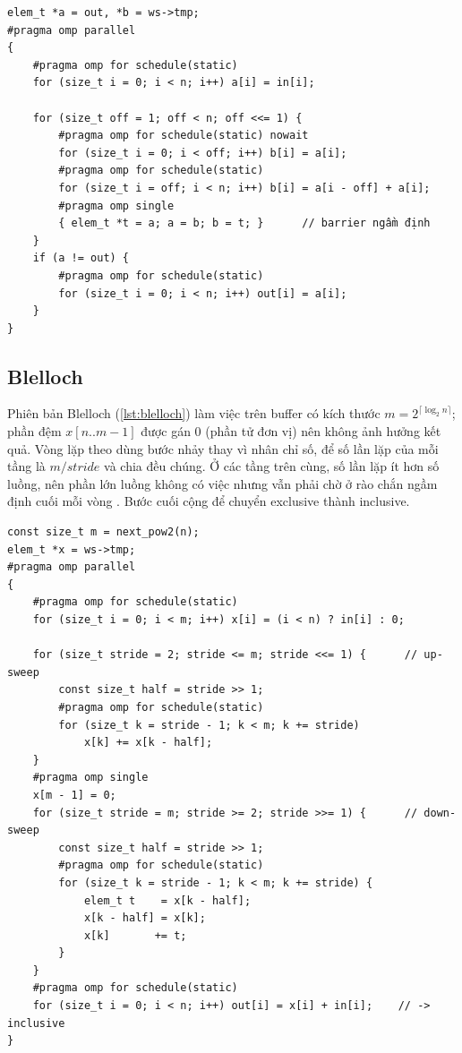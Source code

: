 \begin{lstlisting}[caption={Hillis--Steele với bộ đệm kép.},label={lst:hs}]
elem_t *a = out, *b = ws->tmp;
#pragma omp parallel
{
    #pragma omp for schedule(static)
    for (size_t i = 0; i < n; i++) a[i] = in[i];

    for (size_t off = 1; off < n; off <<= 1) {
        #pragma omp for schedule(static) nowait
        for (size_t i = 0; i < off; i++) b[i] = a[i];
        #pragma omp for schedule(static)
        for (size_t i = off; i < n; i++) b[i] = a[i - off] + a[i];
        #pragma omp single
        { elem_t *t = a; a = b; b = t; }      // barrier ngầm định
    }
    if (a != out) {
        #pragma omp for schedule(static)
        for (size_t i = 0; i < n; i++) out[i] = a[i];
    }
}
\end{lstlisting}

\subsection{Blelloch}

Phiên bản Blelloch (\cref{lst:blelloch}) làm việc trên buffer  có kích thước
\(m = 2^{\lceil\log_2 n\rceil}\); phần đệm \(x[n..m-1]\) được gán 0 (phần tử đơn vị) nên không
ảnh hưởng kết quả. Vòng lặp theo  dùng bước nhảy  thay vì nhân chỉ số, để số
lần lặp của mỗi tầng là \(m/\mathit{stride}\) và  chia đều chúng. Ở các
tầng trên cùng, số lần lặp ít hơn số luồng, nên phần lớn luồng không có việc nhưng vẫn phải chờ
ở rào chắn ngầm định cuối mỗi vòng . Bước cuối cộng  để chuyển exclusive
thành inclusive.

\begin{lstlisting}[caption={Blelloch: up-sweep và down-sweep tại chỗ.},label={lst:blelloch}]
const size_t m = next_pow2(n);
elem_t *x = ws->tmp;
#pragma omp parallel
{
    #pragma omp for schedule(static)
    for (size_t i = 0; i < m; i++) x[i] = (i < n) ? in[i] : 0;

    for (size_t stride = 2; stride <= m; stride <<= 1) {      // up-sweep
        const size_t half = stride >> 1;
        #pragma omp for schedule(static)
        for (size_t k = stride - 1; k < m; k += stride)
            x[k] += x[k - half];
    }
    #pragma omp single
    x[m - 1] = 0;
    for (size_t stride = m; stride >= 2; stride >>= 1) {      // down-sweep
        const size_t half = stride >> 1;
        #pragma omp for schedule(static)
        for (size_t k = stride - 1; k < m; k += stride) {
            elem_t t    = x[k - half];
            x[k - half] = x[k];
            x[k]       += t;
        }
    }
    #pragma omp for schedule(static)
    for (size_t i = 0; i < n; i++) out[i] = x[i] + in[i];    // -> inclusive
}
\end{lstlisting}

